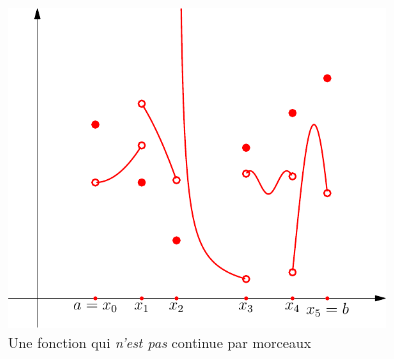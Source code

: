 \begin{figure}[h!t]
 \centering
 \includegraphics[width=10cm]{C2189_3.pdf}
 \caption{Une fonction qui \emph{n'est pas} continue par morceaux}
 \label{fig:C2189_3}
\end{figure}

